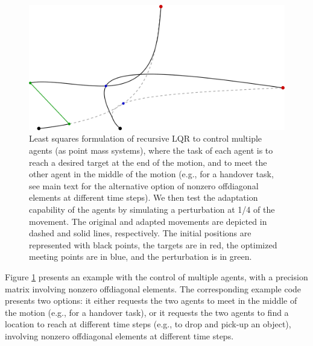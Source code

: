 \documentclass[10pt,a4paper]{article} %
\newcommand{\ty}[1]{{\scriptscriptstyle{#1}}}
\begin{document}
\begin{figure}
\centering
\includegraphics[width=.6\textwidth]{images/LQT_recursive_LS_multiAgents01.png}
\caption{\footnotesize
Least squares formulation of recursive LQR to control multiple agents (as point mass systems), where the task of each agent is to reach a desired target at the end of the motion, and to meet the other agent in the middle of the motion (e.g., for a handover task, see main text for the alternative option of nonzero offdiagonal elements at different time steps). We then test the adaptation capability of the agents by simulating a perturbation at 1/4 of the movement. The original and adapted movements are depicted in dashed and solid lines, respectively. The initial positions are represented with black points, the targets are in red, the optimized meeting points are in blue, and the perturbation is in green.
}
\label{fig:LQT_recursive_LS_multiAgents}
\end{figure}

Figure \ref{fig:LQT_recursive_LS_multiAgents} presents an example with the control of multiple agents, with a precision matrix involving nonzero offdiagonal elements. The corresponding example code presents two options: it either requests the two agents to meet in the middle of the motion (e.g., for a handover task), or it requests the two agents to find a location to reach at different time steps (e.g., to drop and pick-up an object), involving nonzero offdiagonal elements at different time steps.


\end{document}

